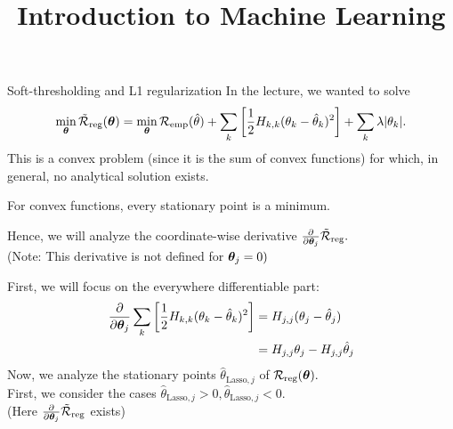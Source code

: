 \documentclass[11pt,compress,t,notes=noshow, xcolor=table]{beamer}
\title{Introduction to Machine Learning}
\date{}
\begin{document}



\begin{vbframe}{Soft-thresholding and L1 regularization}
In the lecture, we wanted to solve
     \[
      \min_{\bm{\theta}} \mathcal{\tilde R}_{\text{reg}}(\bm{\theta}) =  \min_{\bm{\theta}}\mathcal{R}_{\text{emp}}(\hat{\theta}) + \sum_k \left[ \frac{1}{2} H_{k,k} (\theta_k - \hat{\theta}_k)^2 \right] + \sum_k \lambda |\theta_k|.
      \] 
This is a convex problem (since it is the sum of convex functions) for which, in general, no analytical solution exists. \\
\lz

For convex functions, every stationary point is a minimum. \\
\lz

 Hence, we will analyze the coordinate-wise derivative $\frac{\partial}{\partial \bm{\theta}_j} \mathcal{\tilde R}_{\text{reg}}.$ \\
 (Note: This derivative is not defined for $\bm{\theta}_j = 0)$\\

\framebreak

First, we will focus on the everywhere differentiable part:
\begin{align*}
\frac{\partial}{\partial \bm{\theta}_j}\sum_k \left[\frac{1}{2}  H_{k,k} (\theta_k - \hat{\theta}_k)^2 \right]
    &=  H_{j,j} (\theta_j - \hat{\theta}_j)  \\
        &= H_{j,j}\theta_j - H_{j,j} \hat{\theta}_j  \\
\end{align*}
Now, we analyze the stationary points $\hat{\theta}_{\text{Lasso},j}$ of $\mathcal{R}_{\text{reg}}(\bm{\theta}).$ \\
First, we consider the cases $\hat{\theta}_{\text{Lasso},j} > 0, \hat{\theta}_{\text{Lasso},j} < 0.$ \\
(Here $\frac{\partial}{\partial \bm{\theta}_j}\mathcal{\tilde R}_{\text{reg}}$ exists) \\
\lz

\framebreak


\end{vbframe}
\end{document}
